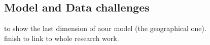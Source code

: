 \newpage
\subsection{Model and Data challenges}

to show the last dimension of aour model (the geographical one). 
\\
finish to link to whole research work.